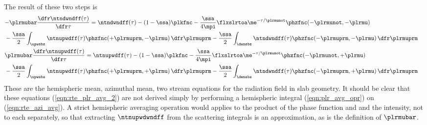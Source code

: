 \documentclass[12pt]{article}
\begin{document}
The result of these two steps is
\begin{subequations}
\label{eqn:rte_plr_avg_2}
\begin{align}
\label{eqn:rte_plr_avg_2_dwn}
\lefteqn{ - \plrmubar \frac{\dfr\ntndwndff(\tau)}{\dfr\tau} = 
\ntndwndff(\tau) - (1-\ssa) \plkfnc - 
\frac{\ssa}{4\mpi} \flxslrtoa \me^{-\tau/\plrmunot}
\phzfnc(-\plrmunot,-\plrmu) }
\nonumber \\ & {} %
- \frac{\ssa}{2} \int_{\upwsbs} \ntnupwdff(\tau) 
\phzfnc(+\plrmuprm,-\plrmu) \,\dfr\plrmuprm
- \frac{\ssa}{2} \int_{\dwnsbs} \ntndwndff(\tau) 
\phzfnc(-\plrmuprm,-\plrmu) \,\dfr\plrmuprm \\
\label{eqn:rte_plr_avg_2_upw}
\lefteqn{ \plrmubar \frac{\dfr\ntnupwdff(\tau)}{\dfr\tau} =  
\ntnupwdff(\tau) - (1-\ssa) \plkfnc -
\frac{\ssa}{4\mpi} \flxslrtoa \me^{-\tau/\plrmunot}
\phzfnc(-\plrmunot,+\plrmu) }
\nonumber \\ & {} %
- \frac{\ssa}{2} \int_{\upwsbs} \ntnupwdff(\tau) 
\phzfnc(+\plrmuprm,+\plrmu) \,\dfr\plrmuprm
- \frac{\ssa}{2} \int_{\dwnsbs} \ntndwndff(\tau) 
\phzfnc(-\plrmuprm,+\plrmu) \,\dfr\plrmuprm
\end{align}
\end{subequations} 
These are the hemispheric mean, azimuthal mean, two stream equations
for the radiation field in slab geometry. 
It should be clear that these equations (\ref{eqn:rte_plr_avg_2}) 
are not derived simply by performing a hemispheric integral
(\ref{eqn:plr_avg_opr}) on (\ref{eqn:rte_azi_avg}). 
A strict hemispheric averaging operation would applies to the product
of the phase function and and the intensity, not to each separately,
so that extracting $\ntnupwdwndff$ from the scattering integrals is an
approximation, as is the definition of $\plrmubar$.
\end{document}
